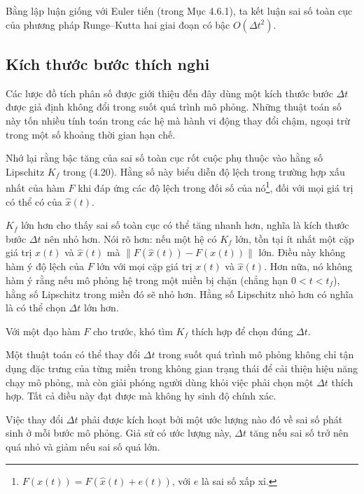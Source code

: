 Bằng lập luận giống với Euler tiến (trong Mục 4.6.1), ta kết luận sai số toàn cục của phương pháp Runge--Kutta hai giai đoạn có bậc $O(\Delta t^2)$.
\subsection{Kích thước bước thích nghi}
Các lược đồ tích phân số được giới thiệu đến đây dùng một kích thước bước $\Delta t$ được giả định không đổi trong suốt quá trình mô phỏng. Những thuật toán số này tốn nhiều tính toán trong các hệ mà hành vi động thay đổi chậm, ngoại trừ trong một số khoảng thời gian hạn chế.

Nhớ lại rằng bậc tăng của sai số toàn cục rốt cuộc phụ thuộc vào hằng số Lipschitz $K_f$ trong (4.20). Hằng số này biểu diễn độ lệch trong trường hợp xấu nhất của hàm $F$ khi đáp ứng các độ lệch trong đối số của nó\footnote{$F(x(t))=F(\hat x(t)+e(t))$, với $e$ là sai số xấp xỉ.}, đối với mọi giá trị có thể có của $\hat x(t)$.

$K_f$ lớn hơn cho thấy sai số toàn cục có thể tăng nhanh hơn, nghĩa là kích thước bước $\Delta t$ nên nhỏ hơn. Nói rõ hơn: nếu một hệ có $K_f$ lớn, tồn tại ít nhất một cặp giá trị $x(t)$ và $\hat x(t)$ mà $\lVert F(\hat x(t))-F(x(t))\rVert$ lớn. Điều này không hàm ý độ lệch của $F$ lớn với mọi cặp giá trị $x(t)$ và $\hat x(t)$. Hơn nữa, nó không hàm ý rằng nếu mô phỏng hệ trong một miền bị chặn (chẳng hạn $0<t<t_f$), hằng số Lipschitz trong miền đó sẽ nhỏ hơn. Hằng số Lipschitz nhỏ hơn có nghĩa là có thể chọn $\Delta t$ lớn hơn.

Với một đạo hàm $F$ cho trước, khó tìm $K_f$ thích hợp để chọn đúng $\Delta t$.

Một thuật toán có thể thay đổi $\Delta t$ trong suốt quá trình mô phỏng không chỉ tận dụng đặc trưng của từng miền trong không gian trạng thái để cải thiện hiệu năng chạy mô phỏng, mà còn giải phóng người dùng khỏi việc phải chọn một $\Delta t$ thích hợp. Tất cả điều này đạt được mà không hy sinh độ chính xác.

Việc thay đổi $\Delta t$ phải được kích hoạt bởi một ước lượng nào đó về sai số phát sinh ở mỗi bước mô phỏng. Giả sử có ước lượng này, $\Delta t$ tăng nếu sai số trở nên quá nhỏ và giảm nếu sai số quá lớn.

